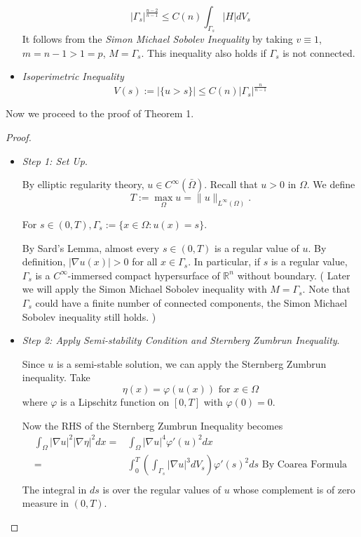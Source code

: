 \documentclass[paper=a4, fontsize=11pt]{scrartcl} %
\numberwithin{equation}{section} %
\numberwithin{figure}{section} %
\numberwithin{table}{section} %
\numberwithin{exercise}{section}
\begin{document}
\begin{itemize}
$$|\Gamma_s|^{\frac{n-2}{n-1}}\leq C(n) \int_{\Gamma_s} |H| dV_s$$
It  follows from the \emph{Simon Michael Sobolev Inequality} by taking $v\equiv 1$, $m=n-1>1=p$, $M=\Gamma_s$. This inequality also holds if $\Gamma_s$ is not connected.

\item \emph{Isoperimetric Inequality}
 $$V(s):=|\{u>s \}|\leq C(n) |\Gamma_s|^{\frac{n}{n-1}}$$
 \end{itemize}


Now we proceed to the proof of Theorem 1.

\begin{proof}
\begin{itemize}
\item  \emph{Step 1: Set Up}.

By elliptic regularity theory, $u\in C^{\infty }(\bar{\Omega})$. Recall that $u>0$ in $\Omega$. We define 
$$T:=\max_{\Omega} u =\|u\|_{L^\infty(\Omega)}.$$

For $s\in (0,T), \Gamma_s:=\{x\in\Omega \colon u(x) =s\}.$ 

By Sard's Lemma, almost every $s\in (0,T)$ is a regular value of $u$. By definition, $|\nabla u(x)|>0$ for all $x\in \Gamma_s.$ In particular, if $s$ is a regular value, $\Gamma_s$ is a $C^{\infty}$-immersed compact hypersurface of $\mathbb{R}^n$ without boundary. ( Later we will apply the Simon Michael Sobolev inequality with $M=\Gamma_s$. Note that $\Gamma_s$ could have a finite number of connected components, the Simon Michael Sobolev inequality still holds. )
\item  \emph{Step 2: Apply Semi-stability Condition and Sternberg  Zumbrun Inequality}.

Since $u$ is a semi-stable solution,  we  can apply the Sternberg Zumbrun inequality.
Take $$\eta (x) =\varphi (u(x)) \mbox { for } x\in\Omega $$
where $\varphi$ is a Lipschitz function on $[0,T]$ with $\varphi(0)=0.$

Now the RHS of the Sternberg  Zumbrun Inequality becomes 
\begin{align*}
\int_{\Omega} |\nabla u|^2 |\nabla \eta|^2 dx=& \int_{\Omega} |\nabla u|^4 \varphi'(u)^2 dx\\
{}=& \int_{0}^T \left( \int_{\Gamma_s} |\nabla u|^3 dV_s \right) \varphi'(s)^2 ds \mbox{ By Coarea Formula}\\
\end{align*}
The integral in $ds$ is over the regular values of $u$ whose complement is of zero measure in $(0,T).$


\end{itemize}
\end{proof}
\end{document}
